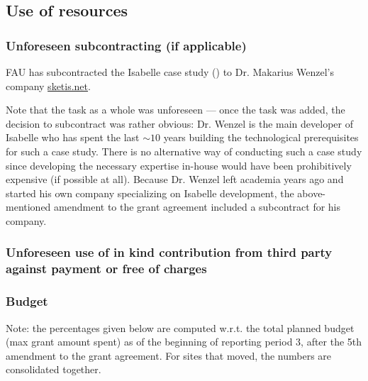 \subsection{Use of resources}

\subsubsection{Unforeseen subcontracting (if applicable)}
FAU has subcontracted the Isabelle case study () to Dr. Makarius Wenzel's company \url{sketis.net}.

Note that the task as a whole was unforeseen --- once the task was added, the decision to subcontract was rather obvious:
Dr. Wenzel is the main developer of Isabelle who has spent the last $\sim 10$ years building the technological prerequisites for such a case study.
There is no alternative way of conducting such a case study since developing the necessary expertise in-house would have been prohibitively expensive (if possible at all).
Because Dr. Wenzel left academia years ago and started his own company
specializing on Isabelle development, the above-mentioned amendment to
the grant agreement included a subcontract for his company.

\subsubsection{Unforeseen use of in kind contribution from third party against payment or free of charges}

\subsubsection{Budget}

Note: the percentages given below are computed w.r.t. the total
planned budget (max grant amount spent) as of the beginning of
reporting period 3, after the 5th amendment to the grant agreement.
For sites that moved, the numbers are consolidated together.

